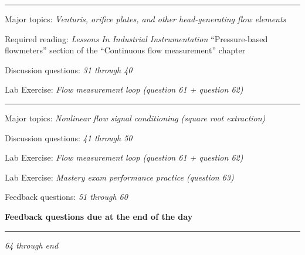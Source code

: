 \vskip 10pt
\hrule \vskip 5pt
\noindent
{}

\hskip 10pt Major topics: {\it Venturis, orifice plates, and other head-generating flow elements}
 
\hskip 10pt Required reading: {\it Lessons In Industrial Instrumentation} ``Pressure-based flowmeters'' section of the ``Continuous flow measurement'' chapter
 
\hskip 10pt Discussion questions: {\it 31 through 40}
 
\hskip 10pt Lab Exercise: {\it Flow measurement loop (question 61 + question 62)}
 



\vskip 10pt
\hrule \vskip 5pt
\noindent
{}

\hskip 10pt Major topics: {\it Nonlinear flow signal conditioning (square root extraction)}
 
\hskip 10pt Discussion questions: {\it 41 through 50}
 
\hskip 10pt Lab Exercise: {\it Flow measurement loop (question 61 + question 62)}
 
\hskip 10pt Lab Exercise: {\it Mastery exam performance practice (question 63)}
 



\vskip 10pt

\hskip 10pt Feedback questions: {\it 51 through 60}
 
\hskip 10pt {\bf Feedback questions due at the end of the day}
 
\vskip 10pt
\hrule \vskip 5pt
\noindent
{}
 
\hskip 10pt {\it 64 through end}
 
